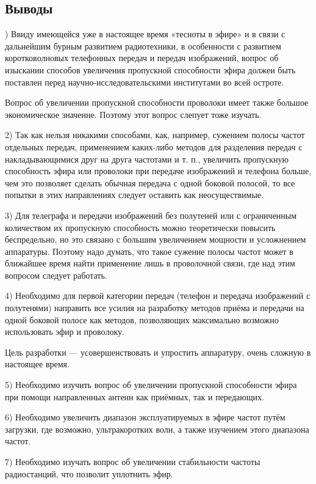 \subsection*{Выводы}

) Ввиду имеющейся уже в настоящее время «тесноты в эфире» и в связи с дальнейшим бурным развитием радиотехники, в особенности с развитием коротковолновых телефонных передач и передач изображений, вопрос об изыскании способов увеличения пропускной способности эфира должеи быть поставлен перед научно-исследовательскими институтами во всей остроте.

Вопрос об увеличении пропускной способности проволоки имеет также большое экономическое значенне. Поэтому этот вопрос слепует тоже изучать.

2) Так как нельзя никакими способами, как, например, сужением полосы частот отдельных передач, применением каких-либо методов для разделения передач с накладывающимися друг на друга частотами и т. п., увеличить пропускную способность эфира или проволоки при передаче изображений и телефона больше, чем это позволяет сделать обычная передача с одной боковой полосой, то все попытки в этих направлениях следует оставить как неосуществимые.

3) Для телеграфа и передачи изображений без полутеней или с ограниченным количеством их пропускную способность можно теоретически повысить беспредельно, но это связано с большим увеличением мощности и усложнением аппаратуры. Поэтому надо думать, что такое сужение полосы частот может в ближайшее время найти применение лишь в проволочной связи, где над этим вопросом следует работать.

4) Необходимо для первой категории передач (телефон и передача изображений с полутенями) направить все усилия на разработку методов приёма и передачи на одной боковой полосе как методов, позволяющих максимально возможно использовать эфир и проволоку. 

Цель разработки --- усовершенствовать и упростить аппаратуру, очень сложную в настоящее время.

5) Необходимо изучить вопрос об увеличении пропускной способности эфира при помощи направленных антенн как приёмных, так и передающих.

6) Необходимо увеличить диапазон эксплуатируемых в эфире частот путём загрузки, где возможно, ультракоротких волн, а также изучением этого диапазона частот.

7) Необходимо изучать вопрос об увеличении стабильности частоты радиостанций, что позволит уплотнить эфир.

